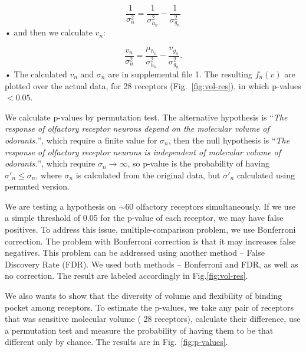 \documentclass[11pt]{article} %
\newcommand{\numberofreceptors}{ 28 }
\begin{document}
\begin{equation}
	\frac{1}{\sigma_n^2} = \frac{1}{\sigma^2_{h_n}}  - \frac{1}{\sigma^2_{g_n}}
\end{equation}•
and then we calculate $v_n$: 

\begin{equation}
	\frac{v_n}{\sigma_n^2}  =    \frac{\mu_{h_n}}{\sigma^2_{h_n}} - \frac{v_{g_n}}{\sigma^2_{g_n}}.
\end{equation}•
The calculated $v_n$ and $\sigma_n$ are in supplemental file 1. 
The resulting $f_n(v)$ are plotted over the actual data, for \numberofreceptors receptors (Fig.~\ref{fig:vol-res}),
in which p-values $<0.05$. 

We calculate p-values by permutation test. 
The alternative hypothesis is 
``{\it The response of olfactory receptor neurons depend on the molecular volume of odorants.}'', 
which require  a finite value for $\sigma_n$, 
then the null hypothesis is 
``{\it The response of olfactory receptor neurons is independent of molecular volume of odorants.}'',
which require $\sigma_n \rightarrow \infty$, 
so p-value is the probability of having $\sigma'_n\leq\sigma_n$, 
where $\sigma_n$ is calculated from the original data, but $\sigma'_n$ calculated using permuted version.

We are testing a hypothesis on  $\sim$60 olfactory receptors simultaneously. 
If we use a simple threshold of 0.05 for the p-value of each receptor, we may have false positives. 
To address this issue, multiple-comparison problem, 
we use Bonferroni correction. 
The problem with Bonferroni correction is that it may increases false negatives.
This problem can be addressed using another method -- False Discovery Rate (FDR).
We used both methods -- Bonferroni and FDR, as well as no correction. 
The result are labeled accordingly in Fig.\ref{fig:vol-res}.

We also wants to show that the diversity of volume and flexibility of binding pocket among receptors.
To estimate the p-values, 
we take any pair of receptors that was sensitive molecular volume (\numberofreceptors receptors),
calculate their difference, 
use a permutation test and measure the probability of having them to be that different only by chance.
The results are in Fig.~\ref{fig:p-values}.

\end{document}
